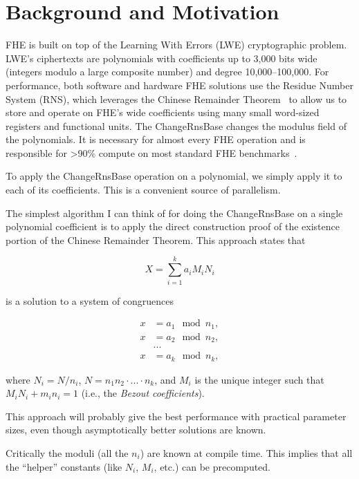 \section{Background and Motivation}\label{sec:background}

FHE is built on top of the Learning With Errors (LWE) cryptographic problem.
LWE’s ciphertexts are polynomials with coefficients up to 3,000 bits wide
(integers modulo a large composite number) and degree 10,000--100,000.
For performance, both software and hardware FHE solutions use the Residue
Number System (RNS), which leverages the Chinese Remainder
Theorem~\cite{garner:1959:residue} to allow us to store and operate on FHE’s
wide coefficients using many small word-sized registers and functional units.
The ChangeRnsBase changes the modulus field of the polynomials.
It is necessary for almost every FHE operation and is responsible for >90\%
compute on most standard FHE
benchmarks~\cite{feldmann:micro21:f1,samardzic:isca22:craterlake,lattigo-github}.

To apply the ChangeRnsBase operation on a polynomial, we simply apply it to
each of its coefficients. This is a convenient source of parallelism.

The simplest algorithm I can think of for doing the ChangeRnsBase on a single
polynomial coefficient is to apply the direct construction proof of the
existence portion of the Chinese Remainder Theorem\cite{gauss1966english}.
This approach states that

\begin{equation*}
X = \sum_{i=1}^k a_i M_i N_i
\end{equation*}

is a solution to a system of congruences

\begin{align*}
    x &= a_1 \mod n_1, \\
    x &= a_2 \mod n_2, \\
      &... \\
    x &= a_k \mod n_k,
\end{align*}

where $N_i = N/n_i$, $N=n_1n_2\cdot...\cdot n_k$, and $M_i$ is the unique integer
such that $M_iN_i + m_in_i = 1$ (i.e., the \emph{Bezout coefficients}).

This approach will probably give the best performance with practical parameter
sizes, even though asymptotically better solutions are known.

Critically the moduli (all the $n_i$) are known at compile time. This implies
that all the “helper” constants (like $N_i$, $M_i$, etc.) can be precomputed.

